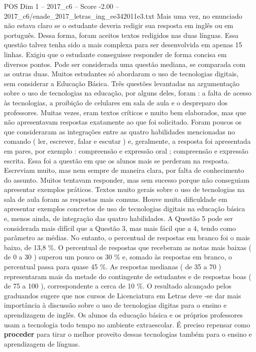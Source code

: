 \begin{textsample}{POS Dim 1 – 2017\_c6 – Score -2.00 – 2017\_c6/enade\_2017\_letras\_ing\_ee342011e3.txt}
Mais uma vez, no enunciado não estava claro se o estudante deveria redigir sua resposta em inglês ou em português.
Dessa forma, foram aceitos textos redigidos nas duas línguas.
Essa questão talvez tenha sido a mais complexa para ser desenvolvida em apenas 15 linhas.
Exigiu que o estudante conseguisse responder de forma concisa em diversos pontos.
Pode ser considerada uma questão mediana, se comparada com as outras duas.
Muitos estudantes só abordaram o uso de tecnologias digitais, sem considerar a Educação Básica.
Três questões levantadas na argumentação sobre o uso de tecnologias na educação, por alguns deles, foram : a falta de acesso às tecnologias, a proibição de celulares em sala de aula e o despreparo dos professores.
Muitas vezes, eram textos críticos e muito bem elaborados, mas que não apresentavam respostas exatamente ao que foi solicitado.
Foram poucos os que consideraram as integrações entre as quatro habilidades mencionadas no comando ( ler, escrever, falar e escutar ) e, geralmente, a resposta foi apresentada em pares, por exemplo : compreensão e expressão oral ; compreensão e expressão escrita.
Essa foi a questão em que os alunos mais se perderam na resposta.
Escreviam muito, mas nem sempre de maneira clara, por falta de conhecimento do assunto.
Muitos tentavam responder, mas sem sucesso porque não conseguiam apresentar exemplos práticos.
Textos muito gerais sobre o uso de tecnologias na sala de aula foram as respostas mais comuns.
Houve muita dificuldade em apresentar exemplos concretos de uso de tecnologias digitais na educação básica e, menos ainda, de integração das quatro habilidades.
A Questão 5 pode ser considerada mais difícil que a Questão 3, mas mais fácil que a 4, tendo como parâmetro as médias.
No entanto, o percentual de respostas em branco foi o mais baixo, de 13,8 \%.
O percentual de respostas que receberam as notas mais baixas ( de 0 a 30 ) superou um pouco os 30 \% e, somado às respostas em branco, o percentual passa para quase 45 \%.
As respostas medianas ( de 35 a 70 ) representaram mais da metade do contingente de estudantes e de respostas boas ( de 75 a 100 ), correspondente a cerca de 10 \%.
O resultado alcançado pelos graduandos sugere que nos cursos de Licenciatura em Letras deve -se dar mais importância à discussão sobre o uso de tecnologias digitas para o ensino e aprendizagem de inglês.
Os alunos da educação básica e os próprios professores usam a tecnologia todo tempo no ambiente extraescolar.
É preciso repensar como \textbf{proceder} para tirar o melhor proveito dessas tecnologias também para o ensino e aprendizagem de línguas.

\end{textsample}
